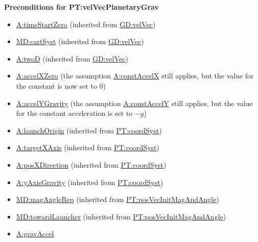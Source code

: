 \documentclass[12pt]{article}
\begin{document}
\noindent \textbf{Preconditions for PT:velVecPlanetaryGrav}
\begin{itemize}
\item \hyperref[timeStartZero]{A:timeStartZero} (inherited from \hyperref[GD:velVec]{GD:velVec})
\item \hyperref[MD:cartSyst]{MD:cartSyst} (inherited from \hyperref[GD:velVec]{GD:velVec})
\item \hyperref[twoD]{A:twoD} (inherited from \hyperref[GD:velVec]{GD:velVec})
\item \hyperref[accelXZero]{A:accelXZero} (the assumption \hyperref[constAccelX]{A:constAccelX} still applies, but the value for the constant is now set to 0)
\item \hyperref[accelYGravity]{A:accelYGravity} (the assumption \hyperref[constAccelY]{A:constAccelY} still applies, but the value for the constant acceleration is set to $-g$)
\item \hyperref[launchOrigin]{A:launchOrigin} (inherited from \hyperref[PT:coordSyst]{PT:coordSyst})
\item \hyperref[targetXAxis]{A:targetXAxis} (inherited from \hyperref[PT:coordSyst]{PT:coordSyst})
\item \hyperref[posXDirection]{A:posXDirection} (inherited from \hyperref[PT:coordSyst]{PT:coordSyst})
\item \hyperref[yAxisGravity]{A:yAxisGravity} (inherited from \hyperref[PT:coordSyst]{PT:coordSyst})
\item \hyperref[MD:magAngleRep]{MD:magAngleRep} (inherited from \hyperref[PT:posVecInitMagAndAngle]{PT:posVecInitMagAndAngle})
\item \hyperref[MD:towardLauncher]{MD:towardLauncher} (inherited from \hyperref[PT:posVecInitMagAndAngle]{PT:posVecInitMagAndAngle})
\item \hyperref[gravAccel]{A:gravAccel}
\end{itemize}
\end{document}
